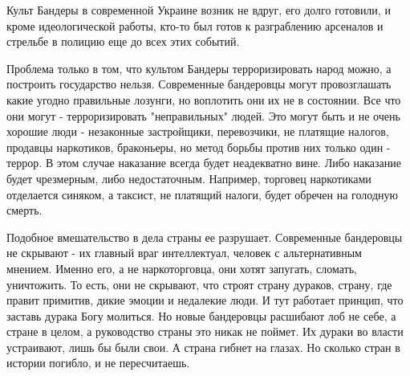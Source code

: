 Культ Бандеры в современной Украине возник не вдруг, его долго готовили, и
кроме идеологической работы, кто-то был готов к разграблению арсеналов и
стрельбе в полицию еще до всех этих событий. 

Проблема только в том, что культом Бандеры терроризировать народ можно, а
построить государство нельзя. Современные бандеровцы могут провозглашать какие
угодно правильные лозунги, но воплотить они их не в состоянии. Все что они
могут - терроризировать "неправильных" людей. Это могут быть и не очень хорошие
люди - незаконные застройщики, перевозчики, не платящие налогов, продавцы
наркотиков, браконьеры, но метод борьбы против них только один - террор. В этом
случае наказание всегда будет неадекватно вине. Либо наказание будет
чрезмерным, либо недостаточным. Например, торговец наркотиками отделается
синяком, а таксист, не платящий налоги, будет обречен на голодную смерть. 

Подобное вмешательство в дела страны ее разрушает. Современные бандеровцы не
скрывают - их главный враг интеллектуал, человек с альтернативным мнением.
Именно его, а не наркоторговца, они хотят запугать, сломать, уничтожить. То
есть, они не скрывают, что строят страну дураков, страну, где правит примитив,
дикие эмоции и недалекие люди. И тут работает принцип, что заставь дурака Богу
молиться. Но новые бандеровцы расшибают лоб не себе, а стране в целом, а
руководство страны это никак не поймет. Их дураки во власти устраивают, лишь бы
были свои. А страна гибнет на глазах. Но сколько стран в истории погибло, и не
пересчитаешь.
